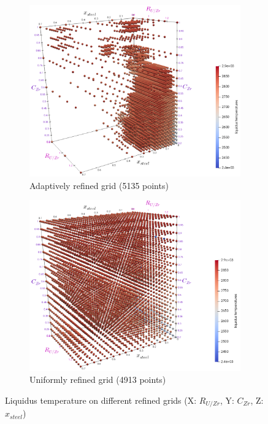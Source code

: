 \documentclass[11pt]{article}\usepackage{geometry} \geometry{letterpaper, margin=25.4mm}
\begin{document}
\begin{figure}[H]
\centering
\begin{subfigure}{0.49\textwidth}
 \centering \includegraphics[width=\textwidth]{figures/CalphadBasedEOSTest/TabulatedBases/TabOpt4_c5_B.png}
\caption{Adaptively refined grid (5135 points)} \label{fig:TabOptRefined} 
\end{subfigure}
\begin{subfigure}{0.49\textwidth}
 \centering \includegraphics[width=\textwidth]{figures/CalphadBasedEOSTest/TabulatedBases/Tab2_inter2_B.png}
\caption{Uniformly refined grid (4913 points)} \label{fig:TabRowRefined} 
\end{subfigure}
\caption{Liquidus temperature on different refined grids (X: $R_{U/Zr}$, Y: $C_{Zr}$, Z: $x_{steel}$)}
\end{figure}
\end{document}
